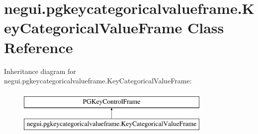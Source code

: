 \hypertarget{classnegui_1_1pgkeycategoricalvalueframe_1_1KeyCategoricalValueFrame}{}\section{negui.\+pgkeycategoricalvalueframe.\+Key\+Categorical\+Value\+Frame Class Reference}
\label{classnegui_1_1pgkeycategoricalvalueframe_1_1KeyCategoricalValueFrame}
Inheritance diagram for negui.\+pgkeycategoricalvalueframe.\+Key\+Categorical\+Value\+Frame\+:\begin{figure}[H]
\begin{center}
\leavevmode
\includegraphics[height=2.000000cm]{classnegui_1_1pgkeycategoricalvalueframe_1_1KeyCategoricalValueFrame}
\end{center}
\end{figure}
